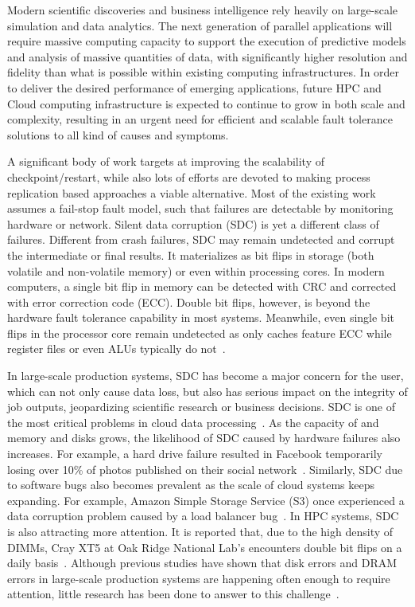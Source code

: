 Modern scientific discoveries and business intelligence rely heavily on large-scale simulation and data analytics. The next generation of parallel applications will require massive computing capacity to support the execution of predictive models and analysis of massive quantities of data, with significantly higher resolution and fidelity than what is possible within existing computing infrastructures. In order to deliver the desired performance of emerging  applications, future HPC and Cloud computing infrastructure is expected to continue to grow in both scale and complexity, resulting in an urgent need for efficient and scalable fault tolerance solutions to all kind of causes and symptoms. 

A significant body of work targets at improving the scalability of checkpoint/restart, while also lots of efforts are devoted to making process replication based approaches a viable alternative. Most of the existing work assumes a fail-stop fault model, such that failures are detectable by monitoring hardware or network. Silent data corruption (SDC) is yet a different class of failures. Different from crash failures, SDC may remain undetected and corrupt the intermediate or final results. It materializes as bit flips in storage (both volatile and non-volatile memory) or even within processing cores. In modern computers, a single bit flip in memory can be detected with CRC and corrected with error correction code (ECC). Double bit flips, however, is beyond the hardware fault tolerance capability in most systems. Meanwhile, even single bit flips in the processor core remain undetected as only caches feature ECC while register files or even ALUs typically do not~\cite{fiala_2012_sdc}.



In large-scale production systems, SDC has become a major concern for the user, which can not only cause data loss, but also has serious impact on the integrity of job outputs, jeopardizing scientific research or business decisions. 
SDC is one of the most critical problems in cloud data processing~\cite{wang2015understanding}. 
As the capacity of and memory and disks grows, the likelihood of SDC caused by hardware failures also increases. For example, a hard drive failure resulted in Facebook temporarily losing over 10\% of photos published on their social network~\cite{wang2015understanding}. Similarly, SDC due to software bugs also becomes prevalent as the scale of cloud systems keeps expanding. For example, Amazon Simple Storage Service (S3) once experienced a data corruption problem caused by a load balancer bug~\cite{balding2009question}. In HPC systems, SDC is also attracting more attention. It is reported that, due to the high density of DIMMs, Cray XT5 at Oak Ridge National Lab’s encounters double bit flips on a daily basis~\cite{geist2011monster}. Although previous studies  have shown that disk errors and DRAM errors in large-scale production systems are happening often enough to require attention, little research has been done to answer to this challenge~\cite{fiala_2012_sdc}.


